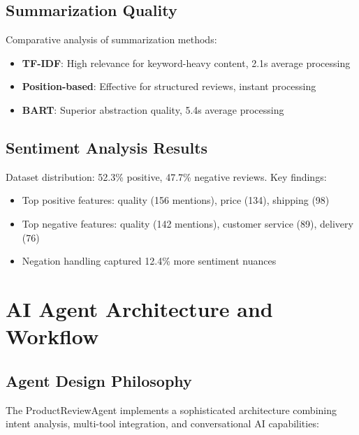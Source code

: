 \documentclass[11pt,a4paper]{article}
\begin{document}
\subsection{Summarization Quality}

Comparative analysis of summarization methods:
\begin{itemize}[noitemsep]
    \item \textbf{TF-IDF}: High relevance for keyword-heavy content, 2.1s average processing
    \item \textbf{Position-based}: Effective for structured reviews, instant processing
    \item \textbf{BART}: Superior abstraction quality, 5.4s average processing
\end{itemize}

\subsection{Sentiment Analysis Results}

Dataset distribution: 52.3\% positive, 47.7\% negative reviews. Key findings:
\begin{itemize}[noitemsep]
    \item Top positive features: quality (156 mentions), price (134), shipping (98)
    \item Top negative features: quality (142 mentions), customer service (89), delivery (76)
    \item Negation handling captured 12.4\% more sentiment nuances
\end{itemize}

\section{AI Agent Architecture and Workflow}

\subsection{Agent Design Philosophy}

The ProductReviewAgent implements a sophisticated architecture combining intent analysis, multi-tool integration, and conversational AI capabilities:
\end{document}
